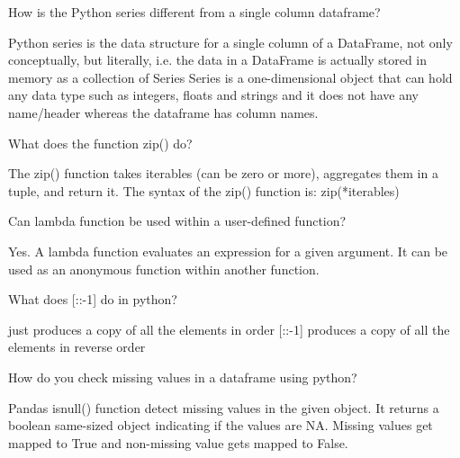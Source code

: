 	\begin{qanda}
		\begin{question}
How is the Python series different from a single column dataframe?
		\end{question}
		\begin{answer}
Python series is the data structure for a single column of a DataFrame, not only conceptually, but literally, i.e. the data in a DataFrame is actually stored in memory as a collection of Series Series is a one-dimensional object that can hold any data type such as integers, floats and strings and it does not have any name/header whereas the dataframe has column names.
		\end{answer}
	\end{qanda}

	\begin{qanda}
		\begin{question}
What does the function zip() do?
		\end{question}
		\begin{answer}
The zip() function takes iterables (can be zero or more), aggregates them in a tuple, and return it. The syntax of the zip() function is: zip(*iterables)
		\end{answer}
	\end{qanda}

	\begin{qanda}
		\begin{question}
 Can lambda function be used within a user-defined function?
		\end{question}
		\begin{answer}
Yes. A lambda function evaluates an expression for a given argument. It can be used as an anonymous function within another function.
		\end{answer}
	\end{qanda}

	\begin{qanda}
		\begin{question}
What does [::-1] do in python?
		\end{question}
		\begin{answer}
[::] just produces a copy of all the elements in order [::-1] produces a copy of all the elements in reverse order
		\end{answer}
	\end{qanda}

	\begin{qanda}
		\begin{question}
 How do you check missing values in a dataframe using python?
		\end{question}
		\begin{answer}
Pandas isnull() function detect missing values in the given object. It returns a boolean same-sized object indicating if the values are NA. Missing values get mapped to True and non-missing value gets mapped to False.
		\end{answer}
	\end{qanda}

